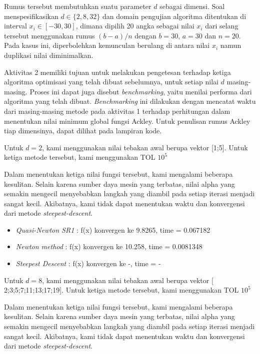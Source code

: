 \documentclass[11pt]{article}
\begin{document}
\medskip

Rumus tersebut membutuhkan suatu parameter $d$ sebagai dimensi. Soal menspesifikasikan $d ∈ \{2, 8, 32\}$ dan domain pengujian algoritma ditentukan di interval $x_{i} ∈ [-30, 30]$, dimana dipilih 20 angka sebagai nilai $x_{i}$ dari selang tersebut menggunakan rumus $(b-a)/n$ dengan $b = 30$, $a = 30$ dan $n = 20$. Pada kasus ini, diperbolehkan kemunculan berulang di antara nilai $x_{i}$ namun duplikasi nilai diminimalkan.

\medskip

Aktivitas 2 memiliki tujuan untuk melakukan pengetesan terhadap ketiga algoritma optimisasi yang telah dibuat sebelumnya, untuk setiap nilai $d$ masing-masing. Proses ini dapat juga disebut \textit{benchmarking}, yaitu menilai performa dari algoritma yang telah dibuat. \textit{Benchmarking} ini dilakukan dengan mencatat waktu dari masing-masing metode pada aktivitas 1 terhadap perhitungan dalam menentukan nilai minimum global fungsi Ackley. Untuk penulisan rumus Ackley tiap dimensinya, dapat dilihat pada lampiran kode.

\medskip
Untuk $d = 2$, kami menggunakan nilai tebakan awal berupa vektor [1;5]. Untuk ketiga metode tersebut, kami menggunakan TOL $10^{5}$

Dalam menentukan ketiga nilai fungsi tersebut, kami mengalami beberapa kesulitan. Selain karena sumber daya mesin yang terbatas, nilai alpha yang semakin mengecil menyebabkan langkah yang diambil pada setiap iterasi menjadi sangat kecil. Akibatnya, kami tidak dapat menentukan waktu dan konvergensi dari metode \textit{steepest-descent}.
\begin{itemize}
    \item \textit{Quasi-Newton SR1} : f(x) konvergen ke 9.8265, time = 0.067182
    \item \textit{Newton method} : f(x) konvergen ke 10.258, time = 0.0081348
    \item \textit{Steepest Descent} : f(x) konvergen ke -, time = -
\end{itemize}

\medskip
Untuk $d = 8$, kami menggunakan nilai tebakan awal berupa vektor [ 2;3;5;7;11;13;17;19]. Untuk ketiga metode tersebut, kami menggunakan TOL $10^{5}$

Dalam menentukan ketiga nilai fungsi tersebut, kami mengalami beberapa kesulitan. Selain karena sumber daya mesin yang terbatas, nilai alpha yang semakin mengecil menyebabkan langkah yang diambil pada setiap iterasi menjadi sangat kecil. Akibatnya, kami tidak dapat menentukan waktu dan konvergensi dari metode \textit{steepest-descent}.
\end{document}
